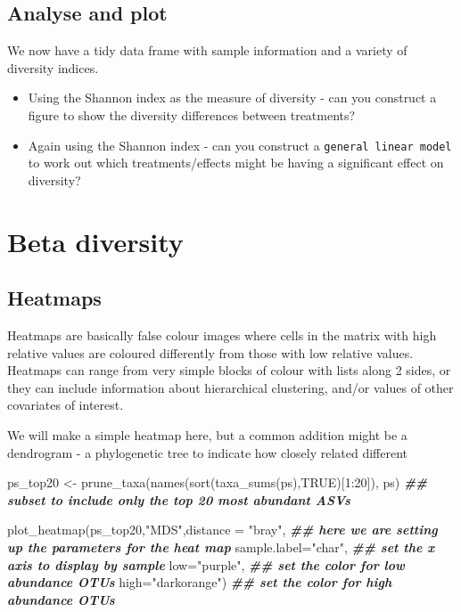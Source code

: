 \documentclass[
]{book}
\newenvironment{Shaded}{\begin{snugshade}}{\end{snugshade}}
\newcommand{\AttributeTok}[1]{\textcolor[rgb]{0.77,0.63,0.00}{#1}}
\newcommand{\ConstantTok}[1]{\textcolor[rgb]{0.00,0.00,0.00}{#1}}
\newcommand{\DecValTok}[1]{\textcolor[rgb]{0.00,0.00,0.81}{#1}}
\newcommand{\DocumentationTok}[1]{\textcolor[rgb]{0.56,0.35,0.01}{\textbf{\textit{#1}}}}
\newcommand{\FunctionTok}[1]{\textcolor[rgb]{0.00,0.00,0.00}{#1}}
\newcommand{\NormalTok}[1]{#1}
\newcommand{\OtherTok}[1]{\textcolor[rgb]{0.56,0.35,0.01}{#1}}
\newcommand{\SpecialCharTok}[1]{\textcolor[rgb]{0.00,0.00,0.00}{#1}}
\newcommand{\StringTok}[1]{\textcolor[rgb]{0.31,0.60,0.02}{#1}}
\begin{document}
\hypertarget{analyse-and-plot}{%
\subsection{Analyse and plot}\label{analyse-and-plot}}

We now have a tidy data frame with sample information and a variety of diversity indices.

\begin{itemize}
\item
  Using the Shannon index as the measure of diversity - can you construct a figure to show the diversity differences between treatments?
\item
  Again using the Shannon index - can you construct a \texttt{general\ linear\ model} to work out which treatments/effects might be having a significant effect on diversity?
\end{itemize}

\hypertarget{beta-diversity}{%
\section{Beta diversity}\label{beta-diversity}}

\hypertarget{heatmaps}{%
\subsection{Heatmaps}\label{heatmaps}}

Heatmaps are basically false colour images where cells in the matrix with high relative values are coloured differently from those with low relative values. Heatmaps can range from very simple blocks of colour with lists along 2 sides, or they can include information about hierarchical clustering, and/or values of other covariates of interest.

We will make a simple heatmap here, but a common addition might be a dendrogram - a phylogenetic tree to indicate how closely related different

\begin{Shaded}
\begin{Highlighting}[]
\NormalTok{ps\_top20 }\OtherTok{\textless{}{-}} \FunctionTok{prune\_taxa}\NormalTok{(}\FunctionTok{names}\NormalTok{(}\FunctionTok{sort}\NormalTok{(}\FunctionTok{taxa\_sums}\NormalTok{(ps),}\ConstantTok{TRUE}\NormalTok{)[}\DecValTok{1}\SpecialCharTok{:}\DecValTok{20}\NormalTok{]), ps) }\DocumentationTok{\#\# subset to include only the top 20 most abundant ASVs}

\FunctionTok{plot\_heatmap}\NormalTok{(ps\_top20,}\StringTok{"MDS"}\NormalTok{,}\AttributeTok{distance =} \StringTok{"bray"}\NormalTok{, }\DocumentationTok{\#\# here we are setting up the parameters for the heat map}
             \AttributeTok{sample.label=}\StringTok{"char"}\NormalTok{, }\DocumentationTok{\#\# set the x axis to display by sample}
             \AttributeTok{low=}\StringTok{"purple"}\NormalTok{,   }\DocumentationTok{\#\# set the color for low abundance OTUs}
             \AttributeTok{high=}\StringTok{"darkorange"}\NormalTok{) }\DocumentationTok{\#\# set the color for high abundance OTUs}
\end{Highlighting}
\end{Shaded}
\end{document}
